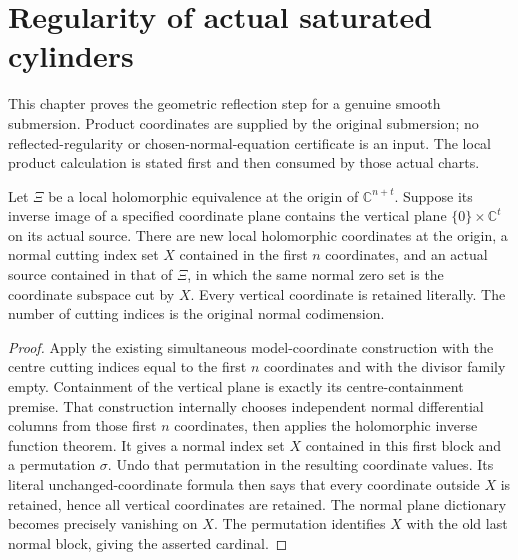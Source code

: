 \section{Regularity of actual saturated cylinders}

This chapter proves the geometric reflection step for a genuine smooth
submersion.  Product coordinates are supplied by the original submersion;
no reflected-regularity or chosen-normal-equation certificate is an input.
The local product calculation is stated first and then consumed by those
actual charts.

\begin{lemma}
\label{hir:saturated-cylinder-vertical-preserving-coordinates}
\leanok
{}
Let $\Xi$ be a local holomorphic equivalence at the origin of
$\mathbb C^{n+t}$.  Suppose its inverse image of a specified coordinate
plane contains the vertical plane $\{0\}\times\mathbb C^t$ on its actual
source.  There are new local holomorphic coordinates at the origin, a
normal cutting index set $X$ contained in the first $n$ coordinates, and
an actual source contained in that of $\Xi$, in which the same normal
zero set is the coordinate subspace cut by $X$.  Every vertical coordinate
is retained literally.  The number of cutting indices is the original
normal codimension.
\end{lemma}
\begin{proof}
Apply the existing simultaneous model-coordinate construction with the
centre cutting indices equal to the first $n$ coordinates and with the
divisor family empty.  Containment of the vertical plane is exactly its
centre-containment premise.  That construction internally chooses
independent normal differential columns from those first $n$ coordinates,
then applies the holomorphic inverse function theorem.  It gives a normal
index set $X$ contained in this first block and a permutation $\sigma$.
Undo that permutation in the resulting coordinate values.  Its literal
unchanged-coordinate formula then says that every coordinate outside $X$
is retained, hence all vertical coordinates are retained.  The normal
plane dictionary becomes precisely vanishing on $X$.  The permutation
identifies $X$ with the old last normal block, giving the asserted cardinal.
\end{proof}

